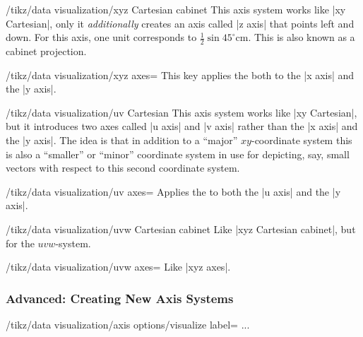 \begin{key}{/tikz/data visualization/xyz Cartesian cabinet}
  This axis system works like |xy Cartesian|, only it
  \emph{additionally} creates an axis called |z axis| that points left
  and down. For this axis, one unit corresponds to $\frac{1}{2}\sin
  45^\circ\mathrm{cm}$. This is also known as a cabinet projection.

  \begin{key}{/tikz/data visualization/xyz axes=}
    This key applies the  both to the |x axis| and the
    |y axis|.
  \end{key}

\end{key}


\begin{key}{/tikz/data visualization/uv Cartesian}
  This axis system works like |xy Cartesian|, but it introduces two
  axes called |u axis| and |v axis| rather than the |x axis| and the
  |y axis|. The idea is that in addition to a ``major''
  $xy$-coordinate system this is also a ``smaller'' or ``minor''
  coordinate system in use for depicting, say, small vectors with
  respect to this second coordinate system.

  \begin{key}{/tikz/data visualization/uv axes=}
    Applies the  to both the |u axis| and the |y axis|.
  \end{key}

\end{key}

\begin{key}{/tikz/data visualization/uvw Cartesian cabinet}
  Like |xyz Cartesian cabinet|, but for the $uvw$-system.

  \begin{key}{/tikz/data visualization/uvw axes=}
    Like |xyz axes|.
  \end{key}
\end{key}



\subsubsection{Advanced: Creating New Axis Systems}


\label{section-dv-visualize-label}

\begin{key}{/tikz/data visualization/axis options/visualize label=}
  ...  
\end{key}




